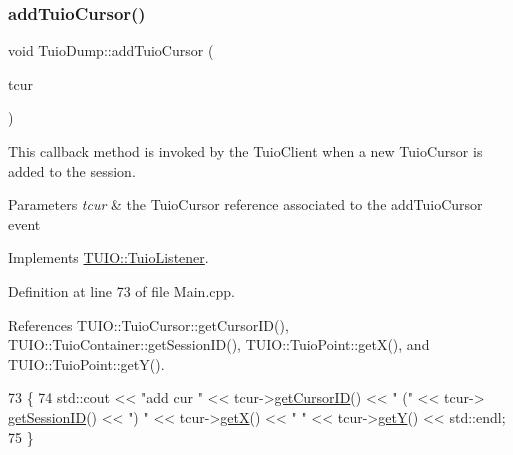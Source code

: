 \subsubsection{\texorpdfstring{add\+Tuio\+Cursor()}{addTuioCursor()}}
{\footnotesize\ttfamily void Tuio\+Dump\+::add\+Tuio\+Cursor (\begin{DoxyParamCaption}\item[{\hyperlink{class_t_u_i_o_1_1_tuio_cursor}{Tuio\+Cursor} $\ast$}]{tcur }\end{DoxyParamCaption})\hspace{0.3cm}{\ttfamily [virtual]}}

This callback method is invoked by the Tuio\+Client when a new Tuio\+Cursor is added to the session.


\begin{DoxyParams}{Parameters}
{\em tcur} & the Tuio\+Cursor reference associated to the add\+Tuio\+Cursor event \\
\hline
\end{DoxyParams}


Implements \hyperlink{class_t_u_i_o_1_1_tuio_listener_a431a957994470c3767e94379debeb875}{T\+U\+I\+O\+::\+Tuio\+Listener}.



Definition at line 73 of file Main.\+cpp.



References T\+U\+I\+O\+::\+Tuio\+Cursor\+::get\+Cursor\+I\+D(), T\+U\+I\+O\+::\+Tuio\+Container\+::get\+Session\+I\+D(), T\+U\+I\+O\+::\+Tuio\+Point\+::get\+X(), and T\+U\+I\+O\+::\+Tuio\+Point\+::get\+Y().


\begin{DoxyCode}
73                                              \{
74     std::cout << \textcolor{stringliteral}{"add cur "} << tcur->\hyperlink{class_t_u_i_o_1_1_tuio_cursor_a3e8ee1381e61eb54c7563e10a2fafb0b}{getCursorID}() << \textcolor{stringliteral}{" ("} <<  tcur->
      \hyperlink{class_t_u_i_o_1_1_tuio_container_a84c29bb63b233dbfd22811dab5b62833}{getSessionID}() << \textcolor{stringliteral}{") "} << tcur->\hyperlink{class_t_u_i_o_1_1_tuio_point_ad5bb767c0a7b151704b59a38793345f0}{getX}() << \textcolor{stringliteral}{" "} << tcur->\hyperlink{class_t_u_i_o_1_1_tuio_point_a6c591de33c3c0f0d5e8df159ce643b7a}{getY}() << std::endl;
75 \}
\end{DoxyCode}
\mbox{\label{class_tuio_dump_a978520453aaf17d3409ae13573b7334f}} 
